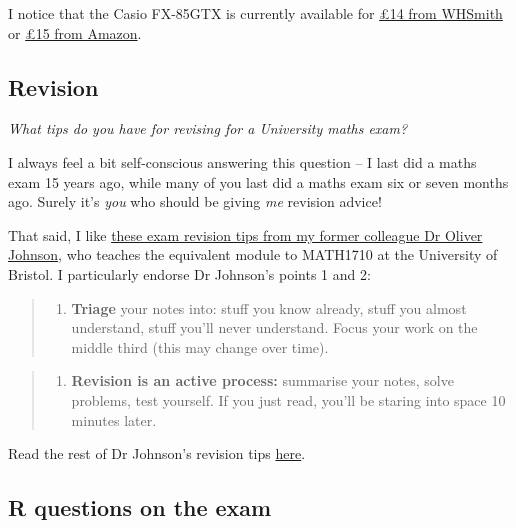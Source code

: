 \documentclass[
  letterpaper,
  DIV=11,
  numbers=noendperiod]{scrreprt}
\providecommand{\tightlist}{%
  \setlength{\itemsep}{0pt}\setlength{\parskip}{0pt}}\usepackage{longtable,booktabs,array}
\theoremstyle{remark}
\begin{document}
I notice that the Casio FX-85GTX is currently available for
\href{https://www.whsmith.co.uk/products/casio-fx85gtx-black-scientific-calculator/4549526607844.html}{£14
from WHSmith} or \href{https://www.amazon.co.uk/dp/B07L68RQCX}{£15 from
Amazon}.

\hypertarget{revision}{%
\subsection{Revision}\label{revision}}

\emph{What tips do you have for revising for a University maths exam?}

I always feel a bit self-conscious answering this question -- I last did
a maths exam 15 years ago, while many of you last did a maths exam six
or seven months ago. Surely it's \emph{you} who should be giving
\emph{me} revision advice!

That said, I like
\href{https://people.maths.bris.ac.uk/~maotj/notes/revise.png}{these
exam revision tips from my former colleague Dr Oliver Johnson}, who
teaches the equivalent module to MATH1710 at the University of Bristol.
I particularly endorse Dr Johnson's points 1 and 2:

\begin{quote}
\begin{enumerate}
\def\labelenumi{\arabic{enumi}.}
\tightlist
\item
  \textbf{Triage} your notes into: stuff you know already, stuff you
  almost understand, stuff you'll never understand. Focus your work on
  the middle third (this may change over time).
\end{enumerate}
\end{quote}

\begin{quote}
\begin{enumerate}
\def\labelenumi{\arabic{enumi}.}
\setcounter{enumi}{1}
\tightlist
\item
  \textbf{Revision is an active process:} summarise your notes, solve
  problems, test yourself. If you just read, you'll be staring into
  space 10 minutes later.
\end{enumerate}
\end{quote}

Read the rest of Dr Johnson's revision tips
\href{https://people.maths.bris.ac.uk/~maotj/notes/revise.png}{here}.

\hypertarget{r-questions-on-the-exam}{%
\subsection{R questions on the exam}\label{r-questions-on-the-exam}}
\end{document}
